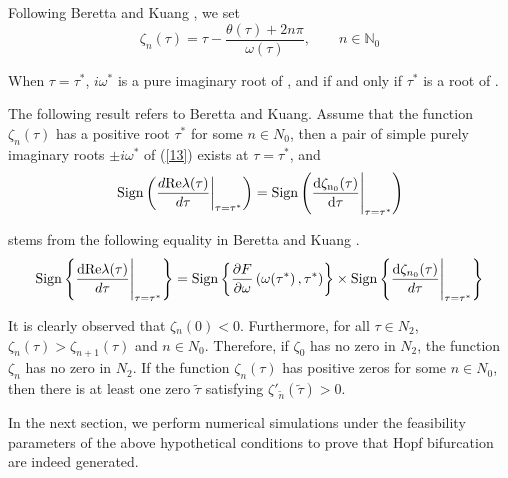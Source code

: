 \documentclass{CMHPhD-SIVD}
\begin{document}
Following Beretta and Kuang \cite{beretta2002geometric}, we set
\begin{equation}\label{21}
\zeta_n(\tau)=\tau-\frac{\theta(\tau)+2n\pi}{\omega(\tau)}, \qquad n\in \mathbb{N}_0
\end{equation}

When $\tau=\tau^*$, $i \omega^*$ is a pure imaginary root of , and if and only if $\tau^*$ is a root of .

The following result refers to Beretta and Kuang.
Assume that the function $\zeta_n(\tau)$ has a positive root $\tau^*$ for some $n\in N_0$, then a pair of simple purely imaginary roots $\pm i \omega^*$ of (\ref{13}) exists at $\tau= \tau^*$, and
\begin{equation}\label{22}
	\left.\operatorname{Sign}\left(\frac{d {\rm Re \lambda(\tau)}}{d\tau}\right|_{\tau=\tau^*}\right)=\rm \operatorname{Sign}\left(\frac{{\rm d} \zeta_{n_0}(\tau)}{d\tau}\Bigg|_{\tau=\tau^*}\right)
\end{equation}

 stems from the following equality in Beretta and Kuang \cite{beretta2002geometric}.
\begin{equation}\label{23}
\operatorname{Sign}\left\{\frac{\rm dRe \lambda(\tau)}{d\tau}\Bigg|_{\tau=\tau^*}\right\}=\operatorname{Sign}\left\{\frac{\partial F}{\partial \omega}\left(\omega(\tau^*\right),\tau^*)\right\}\times \operatorname{Sign}\left\{\frac{{\rm d} \zeta_{n_0}(\tau)}{d\tau}\Bigg|_{\tau=\tau^*}\right\}
\end{equation}

It is clearly observed that $\zeta{_n(0)}<0$. Furthermore, for all $\tau\in N_2$, $\zeta_n(\tau) > \zeta_{n+1}(\tau )$ and $n \in {N_0}$. Therefore, if $\zeta_0$ has no zero in $N_2$, the function $\zeta_n$ has no zero in $N_2$. If the function $\zeta_n(\tau)$ has positive zeros for some $n \in N_0$, then there is at least one zero $\tilde{\tau}$ satisfying $\zeta'_{\tilde{n}}(\tilde{\tau})>0$. 

In the next section, we perform numerical simulations under the feasibility parameters of the above hypothetical conditions to prove that Hopf bifurcation are indeed generated.
\end{document}
